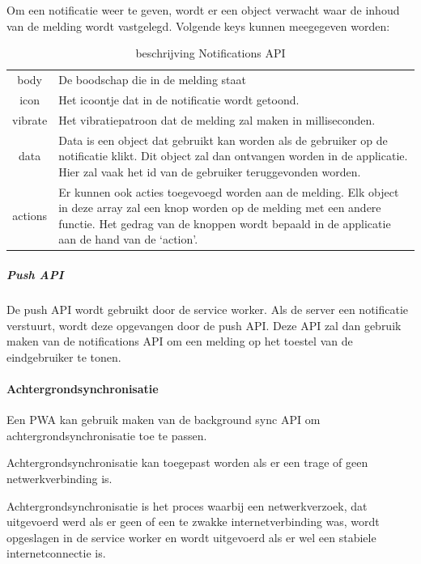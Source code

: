 		
			Om een notificatie weer te geven, wordt er een object verwacht waar de inhoud van de melding wordt vastgelegd. Volgende keys kunnen meegegeven worden:
			
				
			\begin{table}[H]
				\centering
				\begin{tabular}{cp{12cm}}
			       body & De boodschap die in de melding staat  \\
			       icon & Het icoontje dat in de notificatie wordt getoond. \\
			       vibrate & Het vibratiepatroon dat de melding zal maken in milliseconden. \\
			       data & Data is een object dat gebruikt kan worden als de gebruiker op de notificatie  klikt. Dit object zal dan ontvangen worden in de applicatie. Hier zal vaak het id van de gebruiker teruggevonden worden. \\
			       actions & Er kunnen ook acties toegevoegd worden aan de melding. Elk object in deze array zal een knop worden op de melding met een andere functie. Het gedrag van de knoppen wordt bepaald in de applicatie aan de hand van de ‘action’. \\
				\end{tabular}	
				\caption{beschrijving Notifications API}
			\end{table}
			\autocite{Developers2019}
			\autocite{Mozilla2019a}
		
		
		
		\subparagraph{Push API}
		
			De push API wordt gebruikt door de service worker. Als de server een notificatie verstuurt, wordt deze opgevangen door de push API. Deze API zal dan gebruik maken van de notifications API om een melding op het toestel van de eindgebruiker te tonen.
			\autocite{Mozilla2019b}
			\autocite{Gaunt2020}
	
	\paragraph{Achtergrondsynchronisatie }
		Een PWA kan gebruik maken van de background sync API om achtergrondsynchronisatie toe te passen.
		
		Achtergrondsynchronisatie kan toegepast worden als er een trage of geen netwerkverbinding is. 
		
		Achtergrondsynchronisatie is het proces waarbij een netwerkverzoek, dat uitgevoerd werd als er geen of een te zwakke internetverbinding was, wordt opgeslagen in de service worker en wordt uitgevoerd als er wel een stabiele internetconnectie is.
		
